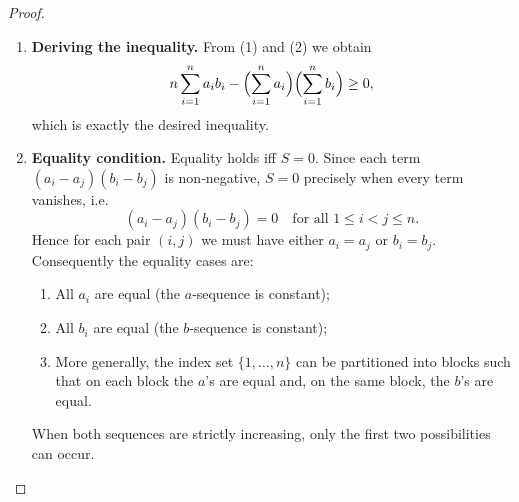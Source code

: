 \begin{proof}
\begin{enumerate}
\item \textbf{Deriving the inequality.}  
From (1) and (2) we obtain
\[
n\sum_{i=1}^{n}a_i b_i-
\Bigl(\sum_{i=1}^{n}a_i\Bigr)\Bigl(\sum_{i=1}^{n}b_i\Bigr)\ge0,
\]
which is exactly the desired inequality.

\item \textbf{Equality condition.}  
Equality holds iff $S=0$.  Since each term $(a_i-a_j)(b_i-b_j)$ is non‑negative, $S=0$ precisely when every term vanishes, i.e.
\[
(a_i-a_j)(b_i-b_j)=0\quad\text{for all }1\le i<j\le n.
\]
Hence for each pair $(i,j)$ we must have either $a_i=a_j$ or $b_i=b_j$.  Consequently the equality cases are:

\begin{enumerate}
\item All $a_i$ are equal (the $a$‑sequence is constant);
\item All $b_i$ are equal (the $b$‑sequence is constant);
\item More generally, the index set $\{1,\dots,n\}$ can be partitioned into blocks such that on each block the $a$’s are equal and, on the same block, the $b$’s are equal.
\end{enumerate}
When both sequences are strictly increasing, only the first two possibilities can occur.

\end{enumerate}
\end{proof}